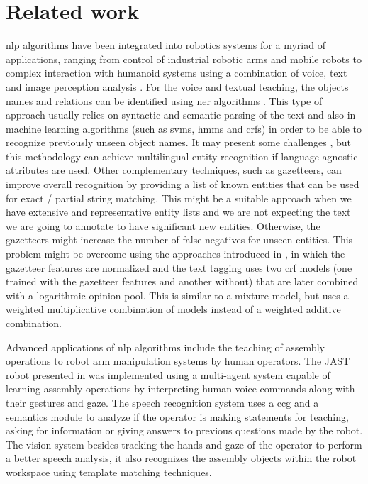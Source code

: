 \section{Related work}\label{sec:related-work}

\gls{nlp} algorithms have been integrated into robotics systems for a myriad of applications, ranging from control of industrial robotic arms \cite{Akan2011,Watanabe2006} and mobile robots \cite{Matuszek2013} to complex interaction with humanoid systems using a combination of voice, text and image perception analysis \cite{Neo2008,Barabas2012}. For the voice and textual teaching, the objects names and relations can be identified using \gls{ner} algorithms \cite{Leon2014,Dlugolinsky2013}. This type of approach usually relies on syntactic and semantic parsing of the text and also in machine learning algorithms \cite{Ekbal2012} (such as \glspl{svm}, \glspl{hmm} and \glspl{crf}) in order to be able to recognize previously unseen object names. It may present some challenges \cite{Ratinov2009}, but this methodology can achieve multilingual entity recognition \cite{Rami2014} if language agnostic attributes are used. Other complementary techniques, such as gazetteers, can improve overall recognition by providing a list of known entities that can be used for exact / partial string matching. This might be a suitable approach when we have extensive and representative entity lists and we are not expecting the text we are going to annotate to have significant new entities. Otherwise, the gazetteers might increase the number of false negatives for unseen entities. This problem might be overcome using the approaches introduced in \cite{Smith2006}, in which the gazetteer features are normalized and the text tagging uses two \gls{crf} models (one trained with the gazetteer features and another without) that are later combined with a logarithmic opinion pool. This is similar to a mixture model, but uses a weighted multiplicative combination of models instead of a weighted additive combination.

Advanced applications of \gls{nlp} algorithms include the teaching of assembly operations to robot arm manipulation systems by human operators. The JAST robot presented in \cite{Rickert2007} was implemented using a multi-agent system capable of learning assembly operations by interpreting human voice commands along with their gestures and gaze. The speech recognition system uses a \gls{ccg} and a semantics module to analyze if the operator is making statements for teaching, asking for information or giving answers to previous questions made by the robot. The vision system besides tracking the hands and gaze of the operator to perform a better speech analysis, it also recognizes the assembly objects within the robot workspace using template matching techniques.

